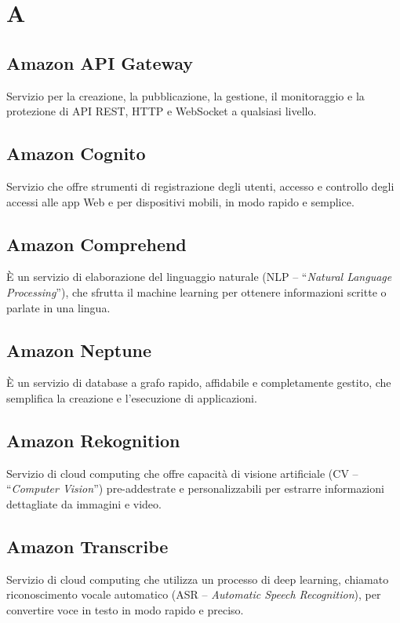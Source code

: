 \section{A}


\subsection{Amazon API Gateway}
Servizio per la creazione, la pubblicazione, la gestione, il monitoraggio e la protezione di API REST, HTTP e WebSocket a qualsiasi livello.

\subsection{Amazon Cognito}
Servizio che offre strumenti di registrazione degli utenti, accesso e controllo degli accessi alle app Web e per dispositivi mobili, in modo rapido e semplice.

\subsection{Amazon Comprehend}
È un servizio di elaborazione del linguaggio naturale (NLP – “\textit{Natural Language Processing}”), che sfrutta il machine learning per ottenere informazioni scritte o parlate in una lingua. 

\subsection{Amazon Neptune}
È un servizio di database a grafo rapido, affidabile e completamente gestito, che semplifica la creazione e l’esecuzione di applicazioni. 

\subsection{Amazon Rekognition}
Servizio di cloud computing che offre capacità di visione artificiale (CV – “\textit{Computer Vision}”) pre-addestrate e personalizzabili per estrarre informazioni dettagliate da immagini e video. 

\subsection{Amazon Transcribe}
Servizio di cloud computing che utilizza un processo di deep learning, chiamato riconoscimento vocale automatico (ASR – \textit{Automatic Speech Recognition}), per convertire voce in testo in modo rapido e preciso.

